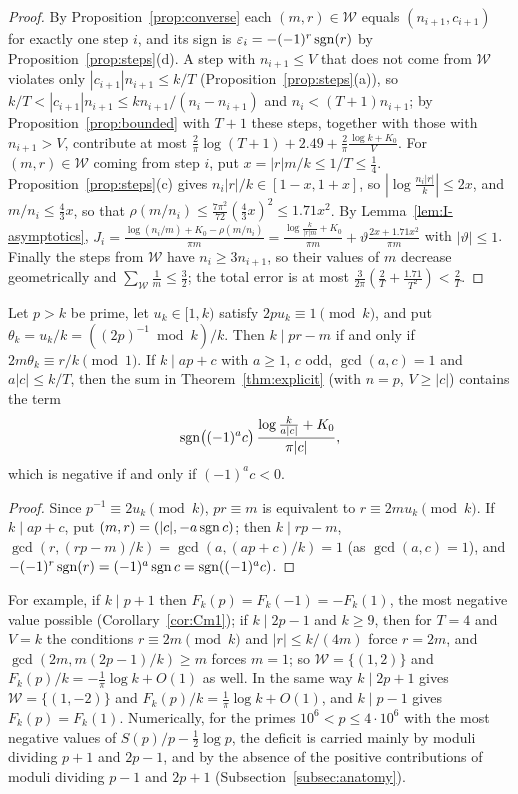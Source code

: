 \begin{proof}
By Proposition~\ref{prop:converse} each $(m,r)\in\mathcal W$ equals $(n_{i+1},c_{i+1})$ for exactly one step $i$, and its sign is $\varepsilon_i=-(-1)^r\operatorname{sgn}(r)$ by Proposition~\ref{prop:steps}(d). A step with $n_{i+1}\le V$ that does not come from $\mathcal W$ violates only $|c_{i+1}|n_{i+1}\le k/T$ (Proposition~\ref{prop:steps}(a)), so $k/T<|c_{i+1}|n_{i+1}\le kn_{i+1}/(n_i-n_{i+1})$ and $n_i<(T+1)n_{i+1}$; by Proposition~\ref{prop:bounded} with $T+1$ these steps, together with those with $n_{i+1}>V$, contribute at most $\frac2\pi\log(T+1)+2.49+\frac2\pi\frac{\log k+K_0}V$. For $(m,r)\in\mathcal W$ coming from step $i$, put $x=|r|m/k\le1/T\le\frac14$. Proposition~\ref{prop:steps}(c) gives $n_i|r|/k\in[1-x,1+x]$, so $|\log\frac{n_i|r|}k|\le2x$, and $m/n_i\le\frac43x$, so that $\rho(m/n_i)\le\frac{7\pi^2}{72}(\frac43x)^2\le1.71x^2$. By Lemma~\ref{lem:I-asymptotics}, $J_i=\frac{\log(n_i/m)+K_0-\rho(m/n_i)}{\pi m}=\frac{\log\frac k{|r|m}+K_0}{\pi m}+\vartheta\frac{2x+1.71x^2}{\pi m}$ with $|\vartheta|\le1$. Finally the steps from $\mathcal W$ have $n_i\ge3n_{i+1}$, so their values of $m$ decrease geometrically and $\sum_{\mathcal W}\frac1m\le\frac32$; the total error is at most $\frac3{2\pi}(\frac2T+\frac{1.71}{T^2})<\frac2T$.
\end{proof}

\begin{corollary}[Singularities of $F_k(p)$]\label{cor:singularities}
Let $p>k$ be prime, let $u_k\in[1,k)$ satisfy $2pu_k\equiv1\pmod k$, and put $\theta_k=u_k/k=((2p)^{-1}\bmod k)/k$. Then $k\mid pr-m$ if and only if $2m\theta_k\equiv r/k\pmod1$. If $k\mid ap+c$ with $a\ge1$, $c$ odd, $\gcd(a,c)=1$ and $a|c|\le k/T$, then the sum in Theorem~\ref{thm:explicit} \textup{(}with $n=p$, $V\ge|c|$\textup{)} contains the term
\[
\operatorname{sgn}\bigl((-1)^ac\bigr)\,\frac{\log\frac k{a|c|}+K_0}{\pi|c|},
\]
which is negative if and only if $(-1)^ac<0$.
\end{corollary}

\begin{proof}
Since $p^{-1}\equiv2u_k\pmod k$, $pr\equiv m$ is equivalent to $r\equiv2mu_k\pmod k$. If $k\mid ap+c$, put $(m,r)=(|c|,-a\operatorname{sgn} c)$; then $k\mid rp-m$, $\gcd(r,(rp-m)/k)=\gcd(a,(ap+c)/k)=1$ (as $\gcd(a,c)=1$), and $-(-1)^r\operatorname{sgn}(r)=(-1)^a\operatorname{sgn} c=\operatorname{sgn}((-1)^ac)$.
\end{proof}

For example, if $k\mid p+1$ then $F_k(p)=F_k(-1)=-F_k(1)$, the most negative value possible (Corollary~\ref{cor:Cm1}); if $k\mid2p-1$ and $k\ge9$, then for $T=4$ and $V=k$ the conditions $r\equiv2m\pmod k$ and $|r|\le k/(4m)$ force $r=2m$, and $\gcd(2m,m(2p-1)/k)\ge m$ forces $m=1$; so $\mathcal W=\{(1,2)\}$ and $F_k(p)/k=-\frac1\pi\log k+O(1)$ as well. In the same way $k\mid2p+1$ gives $\mathcal W=\{(1,-2)\}$ and $F_k(p)/k=\frac1\pi\log k+O(1)$, and $k\mid p-1$ gives $F_k(p)=F_k(1)$. Numerically, for the primes $10^6<p\le4\cdot10^6$ with the most negative values of $S(p)/p-\frac12\log p$, the deficit is carried mainly by moduli dividing $p+1$ and $2p-1$, and by the absence of the positive contributions of moduli dividing $p-1$ and $2p+1$ (Subsection~\ref{subsec:anatomy}).
